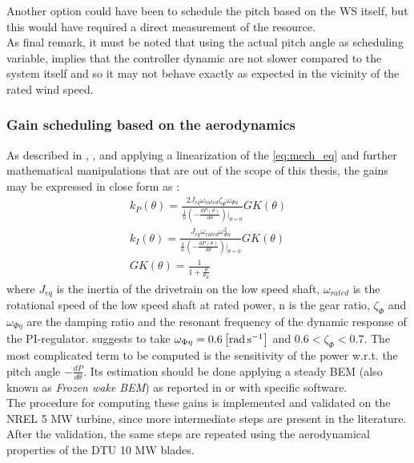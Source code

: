 Another option could have been to schedule the pitch based on the \acrshort{WS} itself, but this would have required a direct measurement of the resource. \\
As final remark, it must be noted that using the actual pitch angle as scheduling variable, implies that 
the controller dynamic are not slower compared to the system itself and so it may not behave exactly as expected in the vicinity of the rated wind speed.

\subsubsection{Gain scheduling based on the aerodynamics}\label{subsec:gain_schdeuling_NREL5MW}

As described in \cite{Aerodynamics_of_wind_turbines}, \cite{NREL_5MW_reference}, and \cite{ris_r_1500} applying a linearization of the \autoref{eq:mech_eq} and further mathematical manipulations that are out of the scope of this thesis,  the gains may be expressed in close form as :
\begin{gather}
    k_P(\theta) = \frac{2J_{eq}\omega_{rated}\zeta_{\Phi}\omega_{\Phi\eta}}{\frac{1}{n}\left(-\frac{dP(\theta)}{d\theta}\right)\vert_{\theta=0}}GK(\theta)
    \label{eq:kp}\\
    k_I(\theta) = \frac{J_{eq}\omega_{rated}\omega_{\Phi\eta}^2}{\frac{1}{n}\left(-\frac{dP(\theta)}{d\theta}\right)\vert_{\theta=0}}GK(\theta)
    \label{eq:ki}\\
    GK(\theta) = \frac{1}{1+\frac{\theta}{\theta_K}} \label{eq:GK}
\end{gather}
where $J_{eq}$ is the inertia of the drivetrain on the low speed shaft, $\omega_{rated}$ is the rotational speed of the low speed shaft at rated power, n is the gear ratio, $\zeta_{\Phi}$ and $\omega_{\Phi\eta}$ are the damping ratio and the resonant frequency of the dynamic response of the PI-regulator. \cite{NREL_5MW_reference} suggests to take $\omega_{\Phi\eta}=0.6\left[\si{\radian\per\second}\right]$ and $0.6<\zeta_{\Phi}<0.7$. The most complicated term to be computed is the sensitivity of the power w.r.t. the pitch angle $-\frac{dP}{d\theta}$. Its estimation should be done applying a steady \acrshort{BEM} (also known as \textit{Frozen wake BEM}) as reported in \cite{Aerodynamics_of_wind_turbines} or with specific software. \\
The procedure for computing these gains is implemented and validated on the NREL 5 MW turbine, since more intermediate steps are present in the literature. After the validation, the same steps are repeated using the aerodynamical properties of the DTU 10 MW blades. \\
